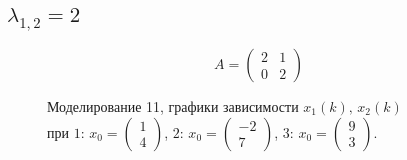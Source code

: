 \documentclass[a5paper, 10pt]{article}
\theoremstyle{definition}
\theoremstyle{plain}
\theoremstyle{remark}
\begin{document}
\subsection{$\lambda_{1, 2} = 2$}
\begin{equation}
A =
\begin{pmatrix}
 2 &  1\\
0 &  2
\end{pmatrix}
\end{equation}
\begin{figure}[h!]
\caption{Моделирование 11, графики зависимости $x_1 \left( k \right), \, x_2 \left( k \right)$ \\ при  $1: \, x_0 = \begin{pmatrix} 1 \\ 4 \end{pmatrix}$, $2: \, x_0 = \begin{pmatrix} -2 \\ 7 \end{pmatrix}$, $3: \, x_0 = \begin{pmatrix} 9 \\ 3 \end{pmatrix}$.}
\end{figure}


\end{document}
